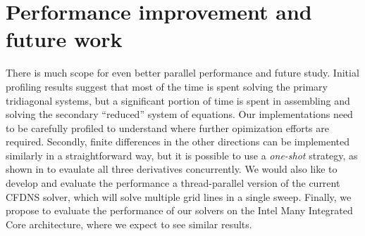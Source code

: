 \documentclass{article}
\begin{document}
\section{Performance improvement and future work}

    There is much scope for even better parallel performance and future study.
    Initial profiling results suggest that most of the time is spent solving
    the primary tridiagonal systems,
    but a significant portion of time is spent in assembling and solving
    the secondary ``reduced'' system of equations.
    Our implementations need to be carefully profiled
    to understand where further opimization efforts are required.
    Secondly, finite differences in the other directions can be implemented similarly
    in a straightforward way,
    but it is possible to use a \emph{one-shot}
    strategy, as shown in \cite{esfahanian2014efficient}
    to evaulate all three derivatives concurrently.
    We would also like to develop and evaluate the performance
    a thread-parallel version of the current CFDNS solver,
    which will solve multiple grid lines in a single sweep.
    Finally, we propose to evaluate the performance of our solvers
    on the Intel Many Integrated Core architecture, where we expect to see
    similar results.

    
    
\end{document}
